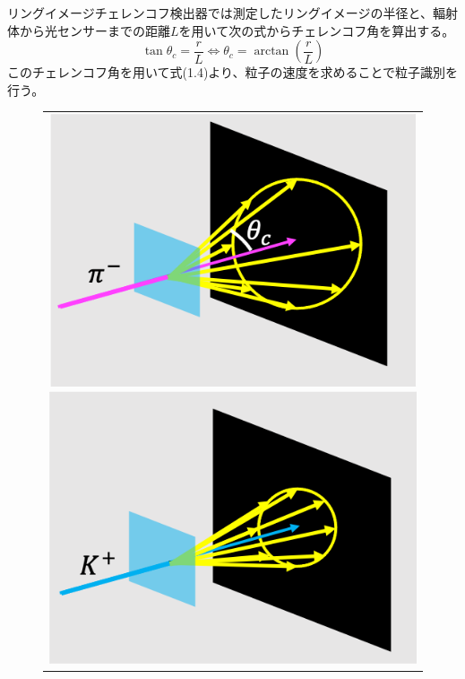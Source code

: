 \documentclass[uplatex, titlepage, dvipdfmx, 12pt, a4paper]{jsreport}
\begin{document}
リングイメージチェレンコフ検出器では測定したリングイメージの半径と、輻射体から光センサーまでの距離$L$を用いて次の式からチェレンコフ角を算出する。
\begin{equation}
\tan \theta_c = \frac{r}{L} \Leftrightarrow \theta_c = \arctan \left(\frac{r}{L}\right)
\end{equation}
このチェレンコフ角を用いて式(1.4)より、粒子の速度を求めることで粒子識別を行う。
\begin{figure}[htbp]
  \begin{center}
    \begin{tabular}{c}

      \begin{minipage}{0.33\hsize}
        \begin{center}
          \includegraphics[clip, scale=0.6]{image/pion.png}
          \hspace{1.6cm}
        \end{center}
      \end{minipage}

      \begin{minipage}{0.33\hsize}
        \begin{center}
          \includegraphics[clip, scale=0.6]{image/kaon.png}
          \hspace{1.6cm}
        \end{center}
      \end{minipage}


\end{tabular}
\end{center}
\end{figure}
\end{document}
